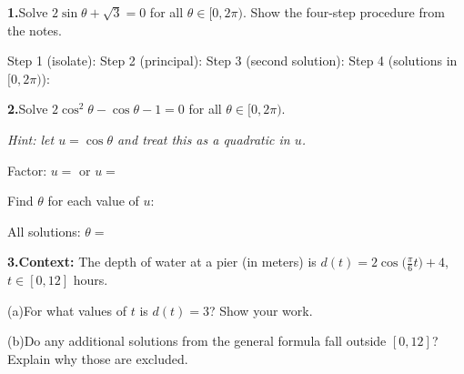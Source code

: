 \documentclass[10pt]{article}
\begin{document}
\vspace{0.08in}

\begin{tcolorbox}[colback=white, colframe=black!40,
    title=\textbf{Tier A --- Apply},
    fonttitle=\bfseries, arc=2mm, left=3mm, right=3mm, top=2mm, bottom=2mm]

\textbf{1.}\quad Solve $2\sin\theta + \sqrt{3} = 0$ for all $\theta \in [0, 2\pi)$.
Show the four-step procedure from the notes.

\vspace{4pt}
Step 1 (isolate): \writeline
Step 2 (principal): \writeline
Step 3 (second solution): \writeline
Step 4 (solutions in $[0,2\pi)$): \writeline

\vspace{0.10in}
\textbf{2.}\quad Solve $2\cos^2\!\theta - \cos\theta - 1 = 0$ for all
$\theta \in [0, 2\pi)$.

\textit{Hint: let $u = \cos\theta$ and treat this as a quadratic in $u$.}

\vspace{4pt}
Factor: \writeline
$u = $ \blank{1.5cm} or $u = $ \blank{1.5cm}

Find $\theta$ for each value of $u$:

All solutions: $\theta = $ \writeline

\vspace{0.10in}
\textbf{3.}\quad \textbf{Context:} The depth of water at a pier (in meters)
is $d(t) = 2\cos\!\bigl(\tfrac{\pi}{6}t\bigr) + 4$, $t \in [0, 12]$ hours.

(a)\quad For what values of $t$ is $d(t) = 3$? Show your work.

(b)\quad Do any additional solutions from the general formula fall outside
$[0, 12]$? Explain why those are excluded.

\end{tcolorbox}

\vspace{0.08in}
\end{document}
